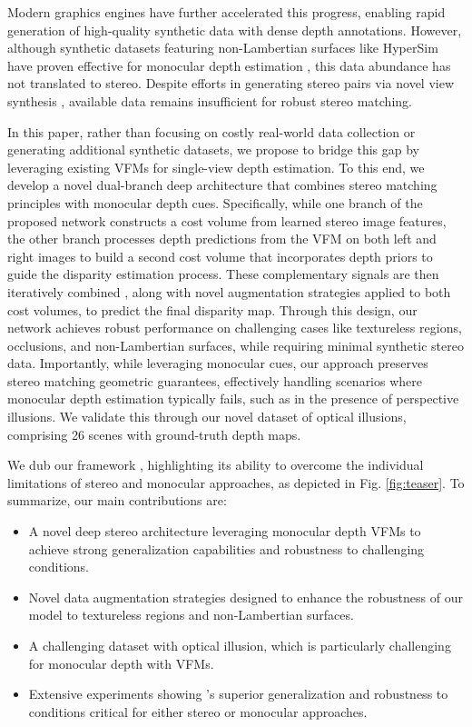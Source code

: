 Modern graphics engines have further accelerated this progress, enabling rapid generation of high-quality synthetic data with dense depth annotations. However, although synthetic datasets featuring non-Lambertian surfaces like HyperSim \cite{roberts2021} have proven effective for monocular depth estimation \cite{Ramirez_2023_CVPR,Ramirez2024,zamaramirez2024tricky}, this data abundance has not translated to stereo. Despite efforts in generating stereo pairs via novel view synthesis \cite{Tosi_2023_CVPR,gjerde2024nerf,ling2024self}, available data remains insufficient for robust stereo matching.

In this paper, rather than focusing on costly real-world data collection or generating additional synthetic datasets, we propose to bridge this gap by leveraging existing VFMs for single-view depth estimation.
To this end, we develop a novel dual-branch deep architecture that combines stereo matching principles with monocular depth cues.
Specifically, while one branch of the proposed network constructs a cost volume from learned stereo image features, the other branch processes depth predictions from the VFM on both left and right images to build a second cost volume that incorporates depth priors to guide the disparity estimation process. These complementary signals are then iteratively combined \cite{lipson2021raft}, along with novel augmentation strategies applied to both cost volumes, to predict the final disparity map. Through this design, our network achieves robust performance on challenging cases like textureless regions, occlusions, and non-Lambertian surfaces, while requiring minimal synthetic stereo data. Importantly, while leveraging monocular cues, our approach preserves stereo matching geometric guarantees, effectively handling scenarios where monocular depth estimation typically fails, such as in the presence of perspective illusions. We validate this through our novel dataset of optical illusions, comprising 26 scenes with ground-truth depth maps. 

We dub our framework \textit{\method}, highlighting its ability to overcome the individual limitations of stereo and monocular approaches, as depicted in Fig. \ref{fig:teaser}. To summarize, our main contributions are:

\begin{itemize}
    \item A novel deep stereo architecture leveraging monocular depth VFMs to achieve strong generalization capabilities and robustness to challenging conditions.
    \item Novel data augmentation strategies designed to enhance the robustness of our model to textureless regions and non-Lambertian surfaces. 
    \item A challenging dataset with optical illusion, which is particularly challenging for monocular depth with VFMs. 
    \item Extensive experiments showing \method's superior generalization and robustness to conditions critical for either stereo or monocular approaches.
\end{itemize}
